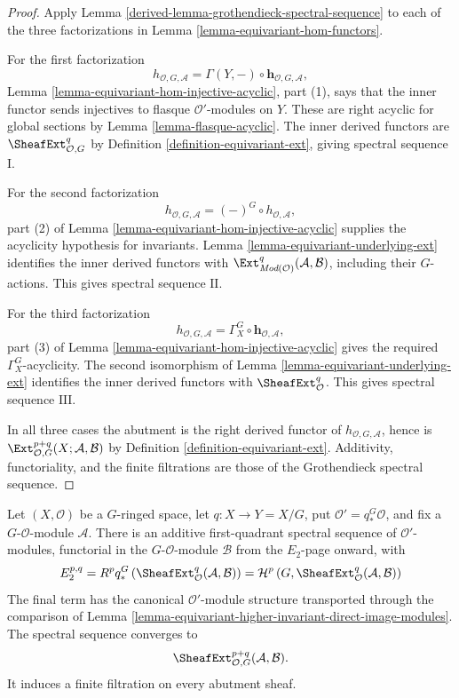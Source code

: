 \begin{proof}
Apply Lemma \ref{derived-lemma-grothendieck-spectral-sequence} to each
of the three factorizations in Lemma
\ref{lemma-equivariant-hom-functors}.

For the first factorization
$$
h_{\mathcal O,G,\mathcal A}
=
\Gamma(Y,-)\circ\mathbf h_{\mathcal O,G,\mathcal A},
$$
Lemma \ref{lemma-equivariant-hom-injective-acyclic}, part (1), says that
the inner functor sends injectives to flasque $\mathcal O'$-modules on
$Y$. These are right acyclic for global sections by Lemma
\ref{lemma-flasque-acyclic}. The inner derived functors are
$\SheafExt^q_{\mathcal O,G}$ by Definition
\ref{definition-equivariant-ext}, giving spectral sequence $\mathrm I$.

For the second factorization
$$
h_{\mathcal O,G,\mathcal A}
=
(-)^G\circ h_{\mathcal O,\mathcal A},
$$
part (2) of Lemma \ref{lemma-equivariant-hom-injective-acyclic} supplies
the acyclicity hypothesis for invariants. Lemma
\ref{lemma-equivariant-underlying-ext} identifies the inner derived
functors with
$\Ext^q_{\textit{Mod}(\mathcal O)}(\mathcal A,\mathcal B)$, including
their $G$-actions. This gives spectral sequence $\mathrm {II}$.

For the third factorization
$$
h_{\mathcal O,G,\mathcal A}
=
\Gamma_X^G\circ\mathbf h_{\mathcal O,\mathcal A},
$$
part (3) of Lemma \ref{lemma-equivariant-hom-injective-acyclic} gives the
required $\Gamma_X^G$-acyclicity. The second isomorphism of Lemma
\ref{lemma-equivariant-underlying-ext} identifies the inner derived
functors with $\SheafExt^q_{\mathcal O}$. This gives spectral sequence
$\mathrm {III}$.

In all three cases the abutment is the right derived functor of
$h_{\mathcal O,G,\mathcal A}$, hence is
$\Ext^{p+q}_{\mathcal O,G}(X;\mathcal A,\mathcal B)$ by Definition
\ref{definition-equivariant-ext}. Additivity, functoriality, and the finite
filtrations are those of the Grothendieck spectral sequence.
\end{proof}


\begin{lemma}
\label{lemma-equivariant-sheaf-ext-spectral-sequence}
\begin{reference}
\cite[Chapter V, \S 5.6, formulas (5.6.4) and (5.6.6)--(5.6.8),
pp. 214--215]{Tohoku}
\end{reference}
Let $(X,\mathcal O)$ be a $G$-ringed space, let $q:X\to Y=X/G$, put
$\mathcal O'=q_*^G\mathcal O$, and fix a $G$-$\mathcal O$-module
$\mathcal A$. There is an additive first-quadrant spectral sequence of
$\mathcal O'$-modules, functorial in the $G$-$\mathcal O$-module
$\mathcal B$ from the $E_2$-page onward, with
$$
E_2^{p,q}
=
R^pq_*^G\left(\SheafExt^q_{\mathcal O}
(\mathcal A,\mathcal B)\right)
=
\mathcal H^p\left(G,\SheafExt^q_{\mathcal O}
(\mathcal A,\mathcal B)\right)
$$
The final term has the canonical $\mathcal O'$-module structure transported
through the comparison of Lemma
\ref{lemma-equivariant-higher-invariant-direct-image-modules}. The spectral
sequence converges to
$$
\SheafExt^{p+q}_{\mathcal O,G}(\mathcal A,\mathcal B).
$$
It induces a finite filtration on every abutment sheaf.
\end{lemma}

